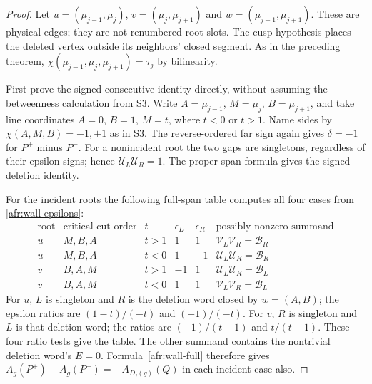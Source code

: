 \begin{proof}
Let $u=(\mu_{j-1},\mu_j)$, $v=(\mu_j,\mu_{j+1})$ and
$w=(\mu_{j-1},\mu_{j+1})$. These are physical edges; they are not
renumbered root slots. The cusp hypothesis places the deleted vertex
outside its neighbors' closed segment. As in the preceding theorem,
$\chi(\mu_{j-1},\mu_j,\mu_{j+1})=\tau_j$ by bilinearity.

First prove the signed consecutive identity directly, without assuming
the betweenness calculation from S3.  Write $A=\mu_{j-1}$, $M=\mu_j$,
$B=\mu_{j+1}$, and take line coordinates $A=0$, $B=1$, $M=t$,
where $t<0$ or $t>1$.  Name sides by $\chi(A,M,B)=-1,+1$ as in
S3.  The reverse-ordered far sign again gives $\delta=-1$ for
$P^+$ minus $P^-$.  For a nonincident root the two gaps are
singletons, regardless of their epsilon signs; hence $\mathcal U_L\mathcal U_R=1$.
The proper-span formula gives the signed deletion identity.

For the incident roots the following full-span table computes all four
cases from \eqref{afr:wall-epsilons}:
\begin{equation}\label{afr:s4-table}
\begin{array}{c|c|c|cc|c}
 \text{root}&\text{critical cut order}&t&
 \epsilon_L&\epsilon_R&
 \text{possibly nonzero summand}\\\hline
 u&M,B,A&t>1&1&1&\mathcal V_L\mathcal V_R=\mathcal B_R\\
 u&M,B,A&t<0&1&-1&\mathcal U_L\mathcal U_R=\mathcal B_R\\
 v&B,A,M&t>1&-1&1&\mathcal U_L\mathcal U_R=\mathcal B_L\\
 v&B,A,M&t<0&1&1&\mathcal V_L\mathcal V_R=\mathcal B_L
\end{array}
\end{equation}
For $u$, $L$ is singleton and $R$ is the deletion word closed by
$w=(A,B)$; the epsilon ratios are $(1-t)/(-t)$ and $(-1)/(-t)$.
For $v$, $R$ is singleton and $L$ is that deletion word; the
ratios are $(-1)/(t-1)$ and $t/(t-1)$.  These four ratio tests give
the table.  The other summand contains the nontrivial deletion
word's $E=0$.  Formula~\eqref{afr:wall-full} therefore gives
$A_g(P^+)-A_g(P^-)=-A_{D_j(g)}(Q)$ in each incident case also.


\end{proof}
